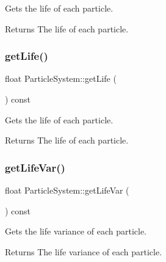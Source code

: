 Gets the life of each particle.

\begin{DoxyReturn}{Returns}
The life of each particle. 
\end{DoxyReturn}
\mbox{\label{classParticleSystem_a81ac82a5e755de1d33cb3e3521a8f0bd}} 
\subsubsection{\texorpdfstring{get\+Life()}{getLife()}\hspace{0.1cm}{\footnotesize\ttfamily [2/2]}}
{\footnotesize\ttfamily float Particle\+System\+::get\+Life (\begin{DoxyParamCaption}{ }\end{DoxyParamCaption}) const\hspace{0.3cm}{\ttfamily [inline]}}

Gets the life of each particle.

\begin{DoxyReturn}{Returns}
The life of each particle. 
\end{DoxyReturn}
\mbox{\label{classParticleSystem_ad069de64232bddbb3d647dda45ebbe33}} 
\subsubsection{\texorpdfstring{get\+Life\+Var()}{getLifeVar()}\hspace{0.1cm}{\footnotesize\ttfamily [1/2]}}
{\footnotesize\ttfamily float Particle\+System\+::get\+Life\+Var (\begin{DoxyParamCaption}{ }\end{DoxyParamCaption}) const\hspace{0.3cm}{\ttfamily [inline]}}

Gets the life variance of each particle.

\begin{DoxyReturn}{Returns}
The life variance of each particle. 
\end{DoxyReturn}
\mbox{\label{classParticleSystem_ad069de64232bddbb3d647dda45ebbe33}} 
